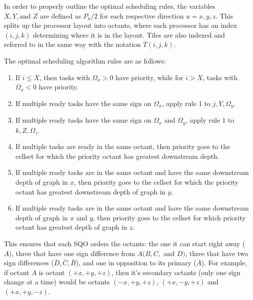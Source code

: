 \documentclass{anstrans}
\begin{document}
In order to properly outline the optimal scheduling rules, the variables $X,Y, \text{and } Z$ are defined as $P_u/2$ for each respective direction $u = x,y,z$. This splits up the processor layout into octants, where each processor has an index $(i,j,k)$ determining where it is in the layout. Tiles are also indexed and referred to in the same way with the notation $T(i,j,k)$. 

The optimal scheduling algorithm rules are as follows:
\begin{enumerate}
\item If $i \leq X$, then tasks with $\Omega_x > 0$ have priority, while for $i > X$, tasks with $\Omega_x < 0$ have priority.
\item If multiple ready tasks have the same sign on $\Omega_x$, apply rule 1 to $j,Y,\Omega_y$.
\item If multiple ready tasks have the same sign on $\Omega_x$ and $\Omega_y$, apply rule 1 to $k,Z, \Omega_z$. 
\item If multiple tasks are ready in the same octant, then priority goes to the cellset for which the priority octant has greatest downstream depth.
\item If multiple ready tasks are in the same octant and have the same downstream depth of graph in $x$, then priority goes to the cellset for which the priority octant has greatest downstream depth of graph in $y$.
\item If multiple ready tasks are in the same octant and have the same downstream depth of graph in $x$ and $y$, then priority goes to the cellset for which priority octant has greatest depth of graph in $z$.
\end{enumerate}
This ensures that each SQO orders the octants: the one it can start right away ($A$), three that have one sign difference from $A (B,C,$ and $D)$, three that have two sign differences ($\bar D, \bar C, \bar B$), and one in opposition to its primary ($\bar A$). For example, if octant $A$ is octant $(+x, +y, +z)$, then it's secondary octants (only one sign change at a time) would be octants $(-x, +y, +z)$, $(+x,-y,+z)$ and $(+x,+y,-z)$.
\end{document}
